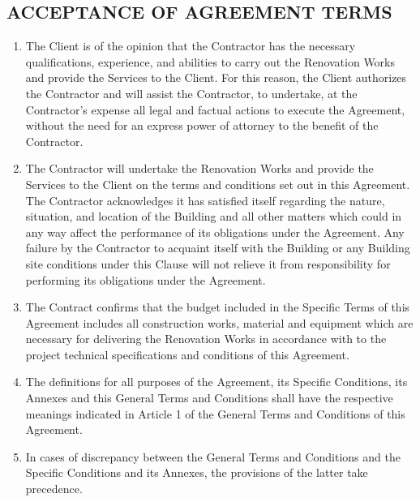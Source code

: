 \begin{multicols}{2}
\subsection{ACCEPTANCE OF AGREEMENT TERMS}
\begin{enumerate}
	\item	The Client is of the opinion that the Contractor has the necessary qualifications, experience, and abilities to carry out the Renovation Works and provide the Services to the Client. For this reason, the Client authorizes the Contractor and will assist the Contractor, to undertake, at the Contractor’s expense all legal and factual actions to execute the Agreement, without the need for an express power of attorney to the benefit of the Contractor.
	\item	The Contractor will undertake the Renovation Works and provide the Services to the Client on the terms and conditions set out in this Agreement. The Contractor acknowledges it has satisfied itself regarding the nature, situation, and location of the Building and all other matters which could in any way affect the performance of its obligations under the Agreement. Any failure by the Contractor to acquaint itself with the Building or any Building site conditions under this Clause will not relieve it from responsibility for performing its obligations under the Agreement.
	\item	The Contract confirms that the budget included in the Specific Terms of this Agreement includes all construction works, material and equipment which are necessary for delivering the Renovation Works in accordance with to the project technical specifications and conditions of this Agreement.
	\item	The definitions for all purposes of the Agreement, its Specific Conditions, its Annexes and this General Terms and Conditions shall have the respective meanings indicated in Article 1 of the General Terms and Conditions of this Agreement.
	\item	In cases of discrepancy between the General Terms and Conditions and the Specific Conditions and its Annexes, the provisions of the latter take precedence.
\end{enumerate}


\end{multicols}
